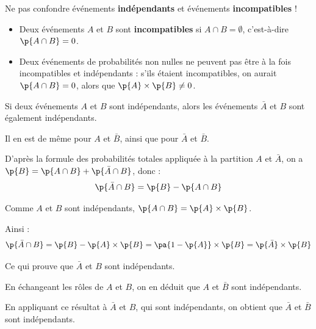 \begin{attention}
	Ne pas confondre événements \textbf{indépendants} et événements \textbf{incompatibles} !

	\begin{itemize}
		\item Deux événements $A$ et $B$ sont \textbf{incompatibles} si $A \cap B = \emptyset$, c'est-à-dire $\p{A \cap B} = 0$.
		\item Deux événements de probabilités non nulles ne peuvent pas être à la fois incompatibles et indépendants : s'ils étaient incompatibles, on aurait $\p{A \cap B} = 0$, alors que $\p{A} \times \p{B} \neq 0$.
	\end{itemize}
\end{attention}

\begin{prop}
	Si deux événements $A$ et $B$ sont indépendants, alors les événements $\bar{A}$ et $B$ sont également indépendants.

	Il en est de même pour $A$ et $\bar{B}$, ainsi que pour $\bar{A}$ et $\bar{B}$.
\end{prop}

\begin{demo}
	D'après la formule des probabilités totales appliquée à la partition $A$ et $\bar{A}$, on a $\p{B} = \p{A \cap B} + \p{\bar{A} \cap B}$, donc :
	\[
		\p{\bar{A} \cap B} = \p{B} - \p{A \cap B}
	\]

	Comme $A$ et $B$ sont indépendants, $\p{A \cap B} = \p{A} \times \p{B}$.

	Ainsi :
	\[
		\p{\bar{A} \cap B} = \p{B} - \p{A} \times \p{B} = \pa{1 - \p{A}} \times \p{B} = \p{\bar{A}} \times \p{B}
	\]

	Ce qui prouve que $\bar{A}$ et $B$ sont indépendants.

	En échangeant les rôles de $A$ et $B$, on en déduit que $A$ et $\bar{B}$ sont indépendants.

	En appliquant ce résultat à $\bar{A}$ et $B$, qui sont indépendants, on obtient que $\bar{A}$ et $\bar{B}$ sont indépendants.
\end{demo}

\newpage

